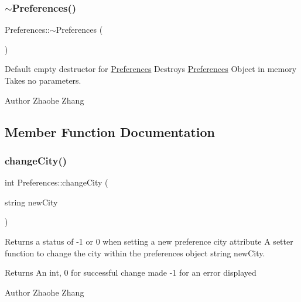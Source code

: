 \subsubsection{\texorpdfstring{$\sim$\+Preferences()}{~Preferences()}}
{\footnotesize\ttfamily Preferences\+::$\sim$\+Preferences (\begin{DoxyParamCaption}{ }\end{DoxyParamCaption})}



Default empty destructor for \mbox{\hyperlink{class_preferences}{Preferences}}  Destroys \mbox{\hyperlink{class_preferences}{Preferences}} Object in memory  Takes no parameters. 

\begin{DoxyAuthor}{Author}
Zhaohe Zhang 
\end{DoxyAuthor}


\subsection{Member Function Documentation}
\mbox{\label{class_preferences_aa89a1bfc76845147a2c0db63ba73bbc7}} 
\subsubsection{\texorpdfstring{change\+City()}{changeCity()}}
{\footnotesize\ttfamily int Preferences\+::change\+City (\begin{DoxyParamCaption}\item[{string}]{new\+City }\end{DoxyParamCaption})}



Returns a status of -\/1 or 0 when setting a new preference city attribute  A setter function to change the city within the preferences object  string new\+City. 

\begin{DoxyReturn}{Returns}
An int, 0 for successful change made -\/1 for an error displayed 
\end{DoxyReturn}
\begin{DoxyAuthor}{Author}
Zhaohe Zhang 
\end{DoxyAuthor}
\mbox{\label{class_preferences_a2224b83d157c6f0010fcbb7b2e52ff5f}} 
